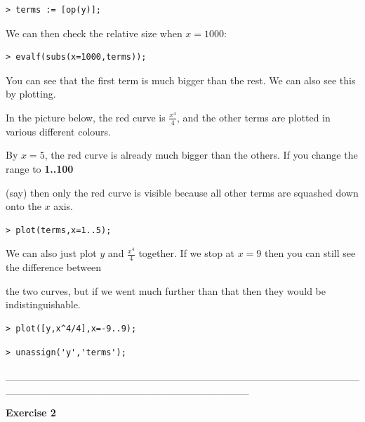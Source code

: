\documentclass{article}
\begin{document}
\begin{lstlisting}
> terms := [op(y)];
\end{lstlisting}
\begin{Maple Normal}
We can then check the relative size when 
$x =1000$:
\end{Maple Normal}
\begin{lstlisting}
> evalf(subs(x=1000,terms));
\end{lstlisting}
\begin{Maple Normal}

\end{Maple Normal}
\begin{Maple Normal}
You can see that the first term is much bigger than the rest.  We can also see this by plotting.\

In the picture below, the red curve is 
$\frac{x^{4}}{4}$, and the other terms are plotted in various different colours.
\end{Maple Normal}
\begin{Maple Normal}
By 
$x =5$, the red curve is already much bigger than the others.  If you change the range to \textcolor[RGB]{255,0,0}{\textbf{1..100}}\

(say) then only the red curve is visible because all other terms are squashed down onto the 
$x$ axis. 
\end{Maple Normal}
\begin{lstlisting}
> plot(terms,x=1..5);
\end{lstlisting}
\begin{Maple Normal}
We can also just plot 
$y$ and 
$\frac{x^{4}}{4}$ together.  If we stop at 
$x =9$ then you can still see the difference between\

the two curves, but if we went much further than that then they would be indistinguishable.
\end{Maple Normal}
\begin{lstlisting}
> plot([y,x^4/4],x=-9..9);
\end{lstlisting}
\begin{lstlisting}
> unassign('y','terms');
\end{lstlisting}
\begin{Maple Normal}
\_\_\_\_\_\_\_\_\_\_\_\_\_\_\_\_\_\_\_\_\_\_\_\_\_\_\_\_\_\_\_\_\_\_\_\_\_\_\_\_\_\_\_\_\_\_\_\_\_\_\_\_\_\_\_\_\_\_\_\_\_\_\_\_\_\_\_\_\_\_\_\_\_\_\_\_\_\_\_\_\_
\end{Maple Normal}
\begin{Maple Heading 2}
\textbf{Exercise 2}
\end{Maple Heading 2}
\end{document}
